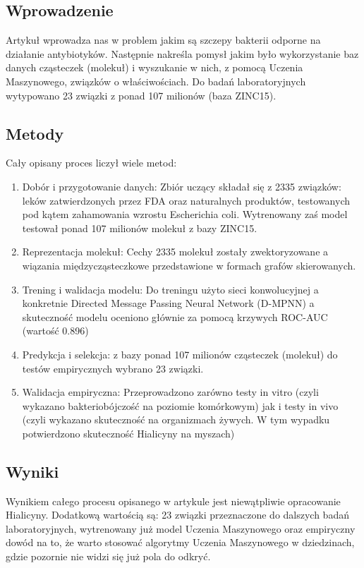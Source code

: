 \subsection{Wprowadzenie}
Artykuł wprowadza nas w problem jakim są szczepy bakterii odporne na działanie antybiotyków. Następnie nakreśla pomysł jakim było wykorzystanie baz danych cząsteczek (molekuł) i wyszukanie w nich, z pomocą Uczenia Maszynowego, związków o właściwościach. Do badań laboratoryjnych wytypowano 23 związki z ponad 107 milionów (baza ZINC15).

\subsection{Metody}
Cały opisany proces liczył wiele metod:
\begin{enumerate}
    \item Dobór i przygotowanie danych: Zbiór uczący składał się z 2335 związków: leków zatwierdzonych przez FDA oraz naturalnych produktów, testowanych pod kątem zahamowania wzrostu Escherichia coli. Wytrenowany zaś model testował ponad 107 milionów molekuł z bazy ZINC15.
    \item Reprezentacja molekuł: Cechy 2335 molekuł zostały zwektoryzowane a wiązania międzycząsteczkowe przedstawione w formach grafów skierowanych.
    \item Trening i walidacja modelu: Do treningu użyto sieci konwolucyjnej a konkretnie Directed Message Passing Neural Network (D-MPNN) a skuteczność modelu oceniono głównie za pomocą krzywych ROC-AUC (wartość 0.896)
    \item Predykcja i selekcja: z bazy ponad 107 milionów cząsteczek (molekuł) do testów empirycznych wybrano 23 związki.
    \item Walidacja empiryczna: Przeprowadzono zarówno testy in vitro (czyli wykazano bakteriobójczość na poziomie komórkowym) jak i testy in vivo (czyli wykazano skuteczność na organizmach żywych. W tym wypadku potwierdzono skuteczność Hialicyny na myszach)
\end{enumerate}

\subsection{Wyniki}
Wynikiem całego procesu opisanego w artykule jest niewątpliwie opracowanie Hialicyny. Dodatkową wartością są: 23 związki przeznaczone do dalszych badań laboratoryjnych, wytrenowany już model Uczenia Maszynowego oraz empiryczny dowód na to, że warto stosować algorytmy Uczenia Maszynowego w dziedzinach, gdzie pozornie nie widzi się już pola do odkryć.

